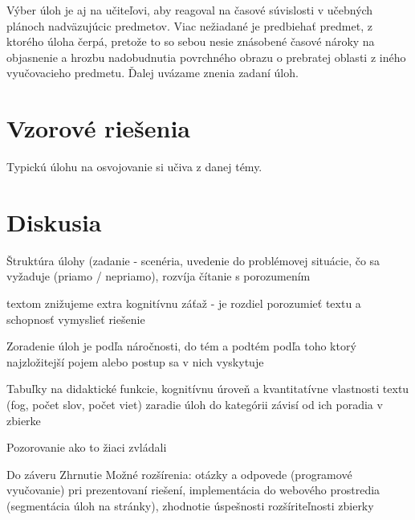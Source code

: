 Výber úloh je aj na učiteľovi, aby reagoval na časové súvislosti v učebných plánoch nadväzujúcic predmetov. Viac nežiadané je predbiehať predmet, z ktorého úloha čerpá, pretože to so sebou nesie znásobené časové nároky na objasnenie a hrozbu nadobudnutia povrchného obrazu o prebratej oblasti z iného vyučovacieho predmetu. Ďalej uvázame znenia zadaní úloh.









\section{Vzorové riešenia}
Typickú úlohu na osvojovanie si učiva z danej témy.



\section{Diskusia}
Štruktúra úlohy (zadanie - scenéria, uvedenie do problémovej situácie, čo sa vyžaduje (priamo / nepriamo), rozvíja čítanie s porozumením


textom znižujeme extra kognitívnu záťaž - je rozdiel porozumieť textu a schopnosť vymyslieť riešenie

Zoradenie úloh je podľa náročnosti, do tém a podtém podľa toho ktorý najzložitejší pojem alebo postup sa v nich vyskytuje

Tabuľky na didaktické funkcie, kognitívnu úroveň a kvantitatívne vlastnosti textu (fog, počet slov, počet viet)
zaradie úloh do kategórii závisí od ich poradia v zbierke

Pozorovanie ako to žiaci zvládali

Do záveru
Zhrnutie
Možné rozšírenia: otázky a odpovede (programové vyučovanie) pri prezentovaní riešení, implementácia do webového prostredia (segmentácia úloh na stránky), zhodnotie úspešnosti rozšíriteľnosti zbierky


